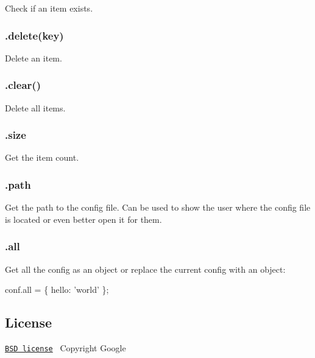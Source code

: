Check if an item exists.

\subsubsection*{.delete(key)}

Delete an item.

\subsubsection*{.clear()}

Delete all items.

\subsubsection*{.size}

Get the item count.

\subsubsection*{.path}

Get the path to the config file. Can be used to show the user where the config file is located or even better open it for them.

\subsubsection*{.all}

Get all the config as an object or replace the current config with an object\+:


\begin{DoxyCode}
conf.all = \{
  hello: 'world'
\};
\end{DoxyCode}


\subsection*{License}

\href{http://opensource.org/licenses/bsd-license.php}{\tt B\+SD license}~\newline
 Copyright Google 